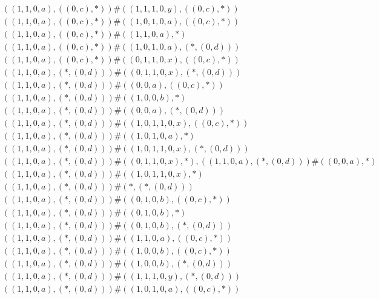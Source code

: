 \begin{align*}
	 & \qquad ((1, 1, 0, a), ((0, c), *)) \# ((1, 1, 1, 0, y), ((0, c), *)) \\ 
	 & \qquad ((1, 1, 0, a), ((0, c), *)) \# ((1, 0, 1, 0, a), ((0, c), *)) \\ 
	 & \qquad ((1, 1, 0, a), ((0, c), *)) \# ((1, 1, 0, a), *) \\ 
	 & \qquad ((1, 1, 0, a), ((0, c), *)) \# ((1, 0, 1, 0, a), (*, (0, d))) \\ 
	 & \qquad ((1, 1, 0, a), ((0, c), *)) \# ((0, 1, 1, 0, x), ((0, c), *)) \\ 
	 & \qquad ((1, 1, 0, a), (*, (0, d))) \# ((0, 1, 1, 0, x), (*, (0, d))) \\ 
	 & \qquad ((1, 1, 0, a), (*, (0, d))) \# ((0, 0, a), ((0, c), *)) \\ 
	 & \qquad ((1, 1, 0, a), (*, (0, d))) \# ((1, 0, 0, b), *) \\ 
	 & \qquad ((1, 1, 0, a), (*, (0, d))) \# ((0, 0, a), (*, (0, d))) \\ 
	 & \qquad ((1, 1, 0, a), (*, (0, d))) \# ((1, 0, 1, 1, 0, x), ((0, c), *)) \\ 
	 & \qquad ((1, 1, 0, a), (*, (0, d))) \# ((1, 0, 1, 0, a), *) \\ 
	 & \qquad ((1, 1, 0, a), (*, (0, d))) \# ((1, 0, 1, 1, 0, x), (*, (0, d))) \\ 
	 & \qquad ((1, 1, 0, a), (*, (0, d))) \# ((0, 1, 1, 0, x), *), ((1, 1, 0, a), (*, (0, d))) \# ((0, 0, a), *) \\ 
	 & \qquad ((1, 1, 0, a), (*, (0, d))) \# ((1, 0, 1, 1, 0, x), *) \\ 
	 & \qquad ((1, 1, 0, a), (*, (0, d))) \# (*, (*, (0, d))) \\ 
	 & \qquad ((1, 1, 0, a), (*, (0, d))) \# ((0, 1, 0, b), ((0, c), *)) \\ 
	 & \qquad ((1, 1, 0, a), (*, (0, d))) \# ((0, 1, 0, b), *) \\ 
	 & \qquad ((1, 1, 0, a), (*, (0, d))) \# ((0, 1, 0, b), (*, (0, d))) \\ 
	 & \qquad ((1, 1, 0, a), (*, (0, d))) \# ((1, 1, 0, a), ((0, c), *)) \\ 
	 & \qquad ((1, 1, 0, a), (*, (0, d))) \# ((1, 0, 0, b), ((0, c), *)) \\ 
	 & \qquad ((1, 1, 0, a), (*, (0, d))) \# ((1, 0, 0, b), (*, (0, d))) \\ 
	 & \qquad ((1, 1, 0, a), (*, (0, d))) \# ((1, 1, 1, 0, y), (*, (0, d))) \\ 
	 & \qquad ((1, 1, 0, a), (*, (0, d))) \# ((1, 0, 1, 0, a), ((0, c), *)) \\ 

\end{align*}
